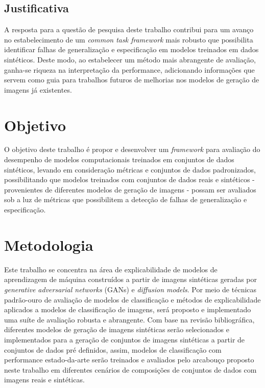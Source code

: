\subsection{Justificativa}

A resposta para a questão de pesquisa deste trabalho contribui para um avanço no estabelecimento de um \textit{common task framework}\cite{ctf} mais robusto que possibilita identificar falhas de generalização e especificação em modelos treinados em dados sintéticos. Deste modo, ao estabelecer um método mais abrangente de avaliação, ganha-se riqueza na interpretação da performance, adicionando informações que servem como guia para trabalhos futuros de melhorias nos modelos de geração de imagens já existentes.

\section{Objetivo}

O objetivo deste trabalho é propor e desenvolver um \textit{framework} para avaliação do desempenho de modelos computacionais treinados em conjuntos de dados sintéticos, levando em consideração métricas e conjuntos de dados padronizados, possibilitando que modelos treinados com conjuntos de dados reais e sintéticos - provenientes de diferentes modelos de geração de imagens - possam ser avaliados sob a luz de métricas que possibilitem a detecção de falhas de generalização e especificação.


\section{Metodologia}
\label{secao:metodologia}

Este trabalho se concentra na área de explicabilidade de modelos de aprendizagem de máquina construídos a partir de imagens sintéticas geradas por \textit{generative adversarial networks} (GANs) e \textit{diffusion models}. Por meio de técnicas padrão-ouro de avaliação de modelos de classificação e métodos de explicabilidade aplicados a modelos de classificação de imagens, será proposto e implementado uma suíte de avaliação robusta e abrangente. Com base na revisão bibliográfica, diferentes modelos de geração de imagens sintéticas serão selecionados e implementados para a geração de conjuntos de imagens sintéticas a partir de conjuntos de dados pré definidos, assim, modelos de classificação com performance estado-da-arte serão treinados e avaliados pelo arcabouço proposto neste trabalho em diferentes cenários de composições de conjuntos de dados com imagens reais e sintéticas.


